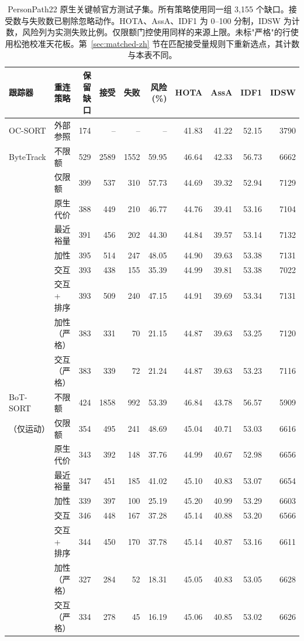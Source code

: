 \begin{table}[t]
\centering
\small
\caption{PersonPath22 原生关键帧官方测试子集。所有策略使用同一组 3,155 个缺口。接受数与失败数已剔除忽略动作。HOTA、AssA、IDF1 为 0--100 分制，IDSW 为计数，风险列为实测失败比例。仅限额门控使用同样的来源上限。未标"严格"的行使用松弛校准天花板。第~\ref{sec:matched-zh} 节在匹配接受量规则下重新选点，其计数与本表不同。}
\label{tab:reconnection-main-zh}
\begin{tabular}{llrrrrrrrr}
\hline
跟踪器 & 重连策略 & 保留缺口 & 接受 & 失败 & 风险 (\%) & HOTA & AssA & IDF1 & IDSW \\
\hline
OC-SORT & 外部参照 & 174 & -- & -- & -- & 41.83 & 41.22 & 52.15 & 3790 \\
\hline
ByteTrack & 不限额 & 529 & 2589 & 1552 & 59.95 & 46.64 & 42.33 & 56.73 & 6662 \\
 & 仅限额 & 399 & 537 & 310 & 57.73 & 44.69 & 39.32 & 52.94 & 7129 \\
 & 原生代价 & 388 & 449 & 210 & 46.77 & 44.76 & 39.41 & 53.16 & 7104 \\
 & 最近裕量 & 391 & 456 & 202 & 44.30 & 44.84 & 39.57 & 53.14 & 7132 \\
 & 加性 & 395 & 514 & 247 & 48.05 & 44.90 & 39.63 & 53.38 & 7131 \\
 & 交互 & 393 & 438 & 155 & 35.39 & 44.99 & 39.81 & 53.38 & 7022 \\
 & 交互 + 排序 & 393 & 509 & 240 & 47.15 & 44.91 & 39.69 & 53.34 & 7131 \\
 & 加性（严格） & 383 & 331 & 70 & 21.15 & 44.87 & 39.63 & 53.25 & 7120 \\
 & 交互（严格） & 383 & 339 & 72 & 21.24 & 44.87 & 39.63 & 53.23 & 7116 \\
\hline
BoT-SORT & 不限额 & 424 & 1858 & 992 & 53.39 & 46.84 & 43.78 & 56.57 & 5909 \\
（仅运动） & 仅限额 & 354 & 495 & 241 & 48.69 & 45.04 & 40.71 & 53.03 & 6616 \\
 & 原生代价 & 343 & 392 & 148 & 37.76 & 44.99 & 40.67 & 52.98 & 6656 \\
 & 最近裕量 & 347 & 451 & 185 & 41.02 & 45.10 & 40.83 & 53.07 & 6654 \\
 & 加性 & 339 & 397 & 100 & 25.19 & 45.20 & 40.99 & 53.29 & 6603 \\
 & 交互 & 346 & 448 & 167 & 37.28 & 45.14 & 40.88 & 53.20 & 6566 \\
 & 交互 + 排序 & 344 & 450 & 170 & 37.78 & 45.14 & 40.87 & 53.16 & 6611 \\
 & 加性（严格） & 327 & 284 & 52 & 18.31 & 45.05 & 40.83 & 53.05 & 6628 \\
 & 交互（严格） & 334 & 278 & 45 & 16.19 & 45.06 & 40.85 & 53.02 & 6626 \\
\hline
\end{tabular}
\end{table}

